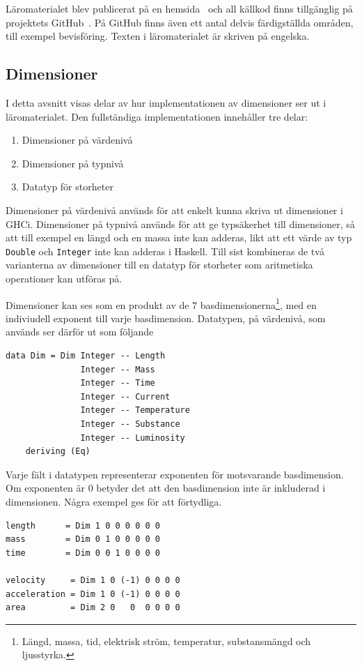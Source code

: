 Läromaterialet blev publicerat på en hemsida~\cite{LYAP} och all källkod finns
tillgänglig på projektets GitHub~\cite{LYAP_repo}. På GitHub finns även ett
antal delvis färdigställda områden, till exempel bevisföring. Texten i
läromaterialet är skriven på engelska.

\subsection{Dimensioner}
\label{sec:grund_impl}

I detta avsnitt visas delar av hur implementationen av dimensioner ser ut i
läromaterialet. Den fullständiga implementationen innehåller tre delar:

\begin{enumerate}
  \item Dimensioner på värdenivå
  \item Dimensioner på typnivå
  \item Datatyp för storheter
\end{enumerate}

Dimensioner på värdenivå används för att enkelt kunna skriva ut dimensioner i
GHCi. Dimensioner på typnivå används för att ge typsäkerhet till dimensioner, så
att till exempel en längd och en massa inte kan adderas, likt att ett värde av
typ \texttt{Double} och \texttt{Integer} inte kan adderas i Haskell. Till sist
kombineras de två varianterna av dimensioner till en datatyp för storheter som
aritmetiska operationer kan utföras på.

Dimensioner kan ses som en produkt av de 7 basdimensionerna\footnote{Längd,
massa, tid, elektrisk ström, temperatur, substansmängd och ljusstyrka.}, med en
indiviudell exponent till varje basdimension. Datatypen, på värdenivå, som
används ser därför ut som följande

\begin{lstlisting}[frame=none,belowskip=-0.5\baselineskip]
data Dim = Dim Integer -- Length
               Integer -- Mass
               Integer -- Time
               Integer -- Current
               Integer -- Temperature
               Integer -- Substance
               Integer -- Luminosity
    deriving (Eq)
\end{lstlisting}

Varje fält i datatypen representerar exponenten för motsvarande basdimension. Om
exponenten är $0$ betyder det att den basdimension inte är inkluderad i
dimensionen. Några exempel ges för att förtydliga.

\begin{lstlisting}[frame=none,belowskip=-0.5\baselineskip]
length      = Dim 1 0 0 0 0 0 0
mass        = Dim 0 1 0 0 0 0 0
time        = Dim 0 0 1 0 0 0 0

velocity     = Dim 1 0 (-1) 0 0 0 0
acceleration = Dim 1 0 (-1) 0 0 0 0
area         = Dim 2 0   0  0 0 0 0
\end{lstlisting}

